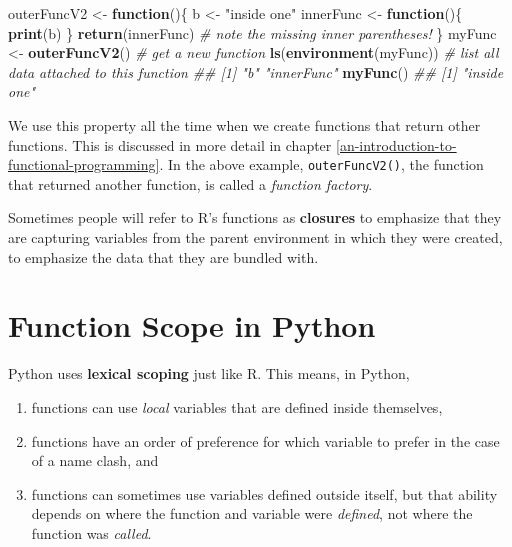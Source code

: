 \documentclass[12pt,krantz2]{krantz}
\makeatletter
\newenvironment{Shaded}{\begin{snugshade}}{\end{snugshade}}
\newcommand{\CommentTok}[1]{\textcolor[rgb]{0.37,0.37,0.37}{\textit{#1}}}
\newcommand{\ControlFlowTok}[1]{\textcolor[rgb]{0.27,0.27,0.27}{\textbf{#1}}}
\newcommand{\KeywordTok}[1]{\textcolor[rgb]{0.27,0.27,0.27}{\textbf{#1}}}
\newcommand{\NormalTok}[1]{#1}
\newcommand{\StringTok}[1]{\textcolor[rgb]{0.5,0.5,0.5}{#1}}
\providecommand{\tightlist}{%
  \setlength{\itemsep}{0pt}\setlength{\parskip}{0pt}}
\newenvironment{kframe}{%
\medskip{}
\setlength{\fboxsep}{.8em}
 \def\at@end@of@kframe{}%
 \ifinner\ifhmode%
  \def\at@end@of@kframe{\end{minipage}}%
  \begin{minipage}{\columnwidth}%
 \fi\fi%
 \def\FrameCommand##1{\hskip\@totalleftmargin \hskip-\fboxsep
 \colorbox{shadecolor}{##1}\hskip-\fboxsep
     \hskip-\linewidth \hskip-\@totalleftmargin \hskip\columnwidth}%
 \MakeFramed {\advance\hsize-\width
   \@totalleftmargin\z@ \linewidth\hsize
   \@setminipage}}%
 {\par\unskip\endMakeFramed%
 \at@end@of@kframe}
\renewenvironment{Shaded}{\begin{kframe}}{\end{kframe}}
\makeatother
\begin{document}
\begin{Shaded}
\begin{Highlighting}[]
\NormalTok{outerFuncV2 <-}\StringTok{ }\ControlFlowTok{function}\NormalTok{()\{}
\NormalTok{  b <-}\StringTok{ "inside one"}
\NormalTok{  innerFunc <-}\StringTok{ }\ControlFlowTok{function}\NormalTok{()\{}
    \KeywordTok{print}\NormalTok{(b)}
\NormalTok{  \}}
  \KeywordTok{return}\NormalTok{(innerFunc) }\CommentTok{# note the missing inner parentheses!}
\NormalTok{\}}
\NormalTok{myFunc <-}\StringTok{ }\KeywordTok{outerFuncV2}\NormalTok{() }\CommentTok{# get a new function}
\KeywordTok{ls}\NormalTok{(}\KeywordTok{environment}\NormalTok{(myFunc)) }\CommentTok{# list all data attached to this function}
\CommentTok{## [1] "b"         "innerFunc"}
\KeywordTok{myFunc}\NormalTok{()}
\CommentTok{## [1] "inside one"}
\end{Highlighting}
\end{Shaded}

We use this property all the time when we create functions that return other functions. This is discussed in more detail in chapter \ref{an-introduction-to-functional-programming}. In the above example, \texttt{outerFuncV2()}, the function that returned another function, is called a \emph{function factory}.

\begin{rmd-details}
Sometimes people will refer to R's functions as \textbf{closures} to emphasize that they are capturing variables from the parent environment in which they were created, to emphasize the data that they are bundled with.

\end{rmd-details}

\hypertarget{function-scope-in-python}{%
\section{Function Scope in Python}\label{function-scope-in-python}}

Python uses \textbf{lexical scoping} just like R. This means, in Python,

\begin{enumerate}
\def\labelenumi{\arabic{enumi}.}
\tightlist
\item
  functions can use \emph{local} variables that are defined inside themselves,\\
\item
  functions have an order of preference for which variable to prefer in the case of a name clash, and
\item
  functions can sometimes use variables defined outside itself, but that ability depends on where the function and variable were \emph{defined}, not where the function was \emph{called}.
\end{enumerate}
\end{document}
